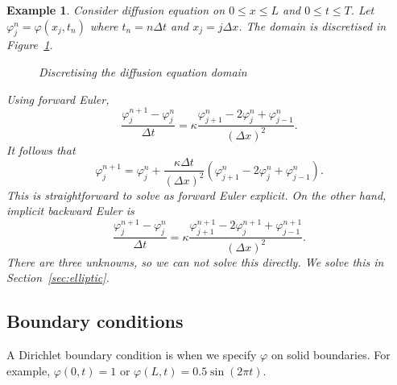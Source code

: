 \documentclass[11pt, a4paper]{article}
\renewcommand{\phi}{\varphi}
\theoremstyle{break}
\newtheorem{eg}[thm]{Example}
\newcommand*{\Paren}[1]{\left(#1\right)}%
\newcommand{\dt}{\Delta t}
\newcommand{\dx}{\Delta x}
\begin{document}
\begin{eg}
	Consider diffusion equation on $0\leq x\leq L$ and $0\leq t\leq T$.  Let $\phi_j^n=\phi(x_j,t_n)$ where $t_n=n\dt$ and $x_j=j\dx$. The domain is discretised in Figure~\ref{fig:diffusionDiscret}.
	
	\begin{figure}\centering
		
		\caption{Discretising the diffusion equation domain}\label{fig:diffusionDiscret}
	\end{figure}
	
	Using forward Euler, \[\frac{\phi_j^{n+1}-\phi_j^n}{\dt}=\kappa\frac{\phi_{j+1}^n-2\phi_j^n+\phi^n_{j-1}}{(\dx)^2}.\] It follows that \[\phi_j^{n+1}=\phi_j^n+\frac{\kappa\dt}{(\dx)^2}\Paren{\phi_{j+1}^n-2\phi_j^n+\phi_{j-1}^n}.\] This is straightforward to solve as forward Euler explicit. On the other hand, implicit backward Euler is \[\frac{\phi_j^{n+1}-\phi_j^n}{\dt}=\kappa\frac{\phi_{j+1}^{n+1}-2\phi_j^{n+1}+\phi^{n+1}_{j-1}}{(\dx)^2}.\] There are three unknowns, so we can not solve this directly. We solve this in Section~\ref{sec:elliptic}.

\end{eg}

\subsection{Boundary conditions}
A Dirichlet boundary condition is when we specify $\phi$ on solid boundaries. For example, $\phi(0,t)=1$ or $\phi(L,t)=0.5\sin(2\pi t)$.
\end{document}
